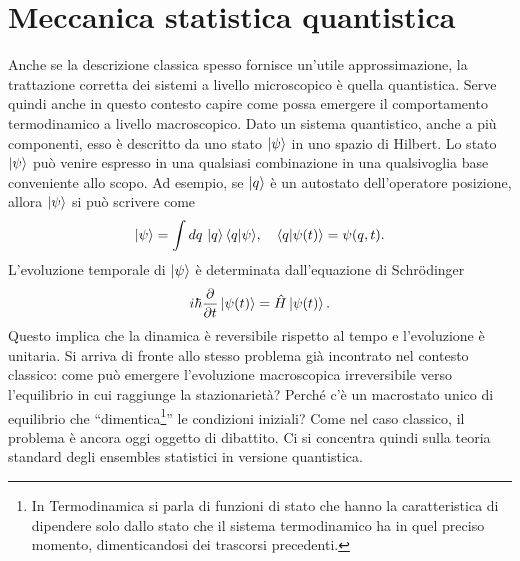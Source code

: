 \chapter{Meccanica statistica quantistica}
Anche se la descrizione classica spesso fornisce un'utile approssimazione, la trattazione corretta dei sistemi a livello microscopico è quella quantistica. Serve quindi anche in questo contesto capire come possa emergere il comportamento termodinamico a livello macroscopico. Dato un sistema quantistico, anche a più componenti, esso è descritto da uno stato $\ket{\psi}$ in uno spazio di Hilbert. Lo stato $\ket{\psi}$ può venire espresso in una qualsiasi combinazione in una qualsivoglia base conveniente allo scopo. Ad esempio, se $\ket{q}$ è un autostato dell'operatore posizione, allora $\ket{\psi}$ si può scrivere come
\begin{equation}
    \ket{\psi} = \int dq\,\ket{q}\langle q | \psi \rangle,\quad \langle q | \psi(t) \rangle = \psi(q,t).
\end{equation}
L'evoluzione temporale di $\ket{\psi}$ è determinata dall'equazione di Schr\"odinger 
\begin{equation}
\label{eq: equazione di Schrodinger}
    i\hbar\frac{\partial}{\partial t}\ket{\psi(t)} = \hat{H}\ket{\psi(t)}.
\end{equation}
Questo implica che la dinamica è reversibile rispetto al tempo e l'evoluzione è unitaria. Si arriva di fronte allo stesso problema già incontrato nel contesto classico: come può emergere l'evoluzione macroscopica irreversibile verso l'equilibrio in cui raggiunge la stazionarietà? Perché c'è un macrostato unico di equilibrio che ``dimentica\footnote{In Termodinamica si parla di funzioni di stato che hanno la caratteristica di dipendere solo dallo stato che il sistema termodinamico ha in quel preciso momento, dimenticandosi dei trascorsi precedenti.}'' le condizioni iniziali? Come nel caso classico, il problema è ancora oggi oggetto di dibattito. Ci si concentra quindi sulla teoria standard degli ensembles statistici in versione quantistica. 

